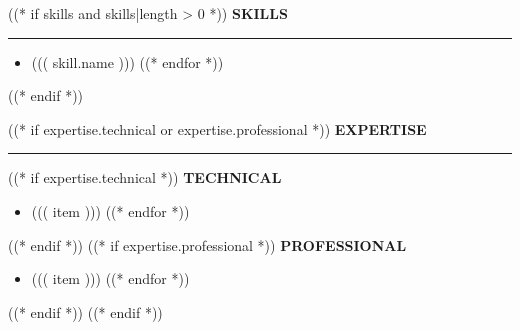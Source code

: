 \documentclass[11pt,a4paper]{article}
\newcommand{\leftsectiontitle}[1]{%
  {\fontsize{10}{12}\selectfont\bfseries\color{navy}\MakeUppercase{#1}}\\[-2pt]
  \rule{0.28\textwidth}{0.4pt}\vspace{4pt}
}
\begin{document}
\begin{minipage}[t]{0.30\textwidth}
\begin{minipage}[t]{0.85\textwidth}
((* if skills and skills|length > 0 *))
\leftsectiontitle{Skills}
\begin{itemize}[leftmargin=12pt, itemsep=2pt, parsep=0pt, topsep=0pt, label=\textbullet]
((* for skill in skills *))
\item {\small ((( skill.name )))}
((* endfor *))
\end{itemize}
\vspace{6pt}
((* endif *))

((* if expertise.technical or expertise.professional *))
\leftsectiontitle{Expertise}
((* if expertise.technical *))
{\small\bfseries\color{muted}\MakeUppercase{Technical}}\\[2pt]
\begin{itemize}[leftmargin=12pt, itemsep=1pt, parsep=0pt, topsep=0pt, label=\textbullet]
((* for item in expertise.technical *))
\item {\small ((( item )))}
((* endfor *))
\end{itemize}
\vspace{6pt}
((* endif *))
((* if expertise.professional *))
{\small\bfseries\color{muted}\MakeUppercase{Professional}}\\[2pt]
\begin{itemize}[leftmargin=12pt, itemsep=1pt, parsep=0pt, topsep=0pt, label=\textbullet]
((* for item in expertise.professional *))
\item {\small ((( item )))}
((* endfor *))
\end{itemize}
((* endif *))
((* endif *))

\end{minipage}
\end{minipage}%
\hfill
\end{document}
